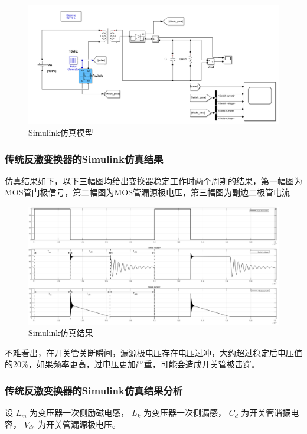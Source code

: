 \documentclass[UTF8]{ctexart}
\numberwithin{equation}{section}
\begin{document}
	\begin{figure}[h]
		\centering
		\includegraphics[scale=0.36]{image/tranditional_flyback.png}
		\caption{Simulink仿真模型}
	\end{figure}
	\subsubsection{传统反激变换器的Simulink仿真结果}
	仿真结果如下，以下三幅图均给出变换器稳定工作时两个周期的结果，第一幅图为MOS管门极信号，第二幅图为MOS管漏源极电压，第三幅图为副边二极管电流
	
	\begin{figure}[h]
		\centering
		\includegraphics[scale=0.2]{image/scope.png}
		\caption{Simulink仿真结果}
	\end{figure}

	不难看出，在开关管关断瞬间，漏源极电压存在电压过冲，大约超过稳定后电压值的20\%，如果频率更高，过电压更加严重，可能会造成开关管被击穿。
	
	\subsubsection{传统反激变换器的Simulink仿真结果分析}
	设 $L_m$ 为变压器一次侧励磁电感， $L_k$ 为变压器一次侧漏感， $C_d$ 为开关管谐振电容， $V_{ds}$ 为开关管漏源极电压。
	
\end{document}
